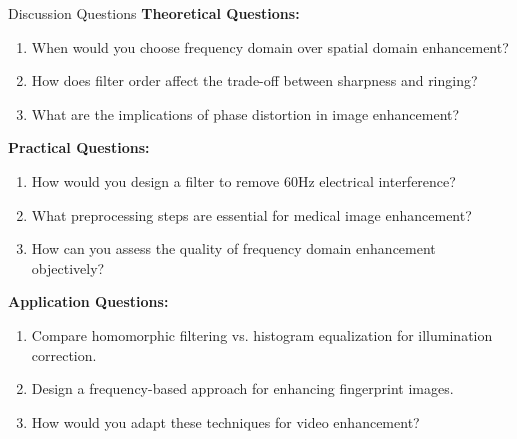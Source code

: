 \documentclass[aspectratio=169,10pt]{beamer}
\begin{document}
\begin{frame}{Discussion Questions}
\textbf{Theoretical Questions:}
\begin{enumerate}
\item When would you choose frequency domain over spatial domain enhancement?
\item How does filter order affect the trade-off between sharpness and ringing?
\item What are the implications of phase distortion in image enhancement?
\end{enumerate}

\textbf{Practical Questions:}
\begin{enumerate}
\item How would you design a filter to remove 60Hz electrical interference?
\item What preprocessing steps are essential for medical image enhancement?
\item How can you assess the quality of frequency domain enhancement objectively?
\end{enumerate}

\textbf{Application Questions:}
\begin{enumerate}
\item Compare homomorphic filtering vs. histogram equalization for illumination correction.
\item Design a frequency-based approach for enhancing fingerprint images.
\item How would you adapt these techniques for video enhancement?
\end{enumerate}
\end{frame}
\end{document}
